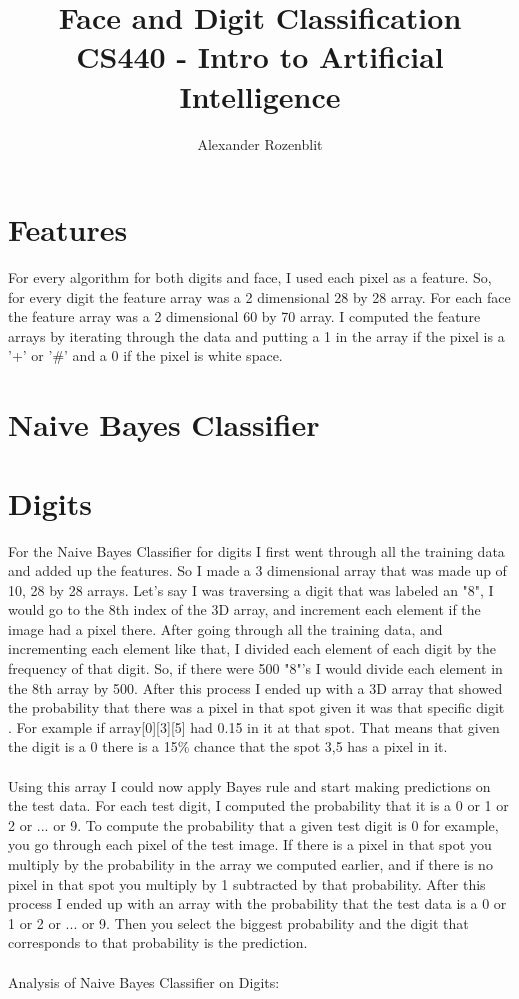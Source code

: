 \documentclass[12pt]{article}
\begin{document}
\title{%
 Face and Digit Classification \\
  \large CS440 - Intro to Artificial Intelligence}

\author{Alexander Rozenblit}


\maketitle

\section*{Features}
For every algorithm for both digits and face, I used each pixel as a feature. So, for every digit the feature array was a 2 dimensional 28 by 28 array. For each face the feature array was a 2 dimensional 60 by 70 array. I computed the feature arrays by iterating through the data and putting a 1 in the array if the pixel is a '+' or '\#' and a 0 if the pixel is white space.

\section*{Naive Bayes Classifier}
\section*{Digits}
For the Naive Bayes Classifier for digits I first went through all the training data and added up the features. So I made a 3 dimensional array that was made up of 10, 28 by 28 arrays. Let's say I was traversing a digit that was labeled an "8", I would go to the 8th index of the 3D array, and increment each element if the image had a pixel there. After going through all the training data, and incrementing each element like that, I divided each element of each digit by the frequency of that digit. So, if there were 500 "8"'s I would divide each element in the 8th array by 500. After this process I ended up with a 3D array that showed the probability that there was a pixel in that spot given it was that specific digit . For example if array[0][3][5] had 0.15 in it at that spot. That means that given the digit is a 0 there is a 15\% chance that the spot 3,5 has a pixel in it.\\\\
Using this array I could now apply Bayes rule and start making predictions on the test data. For each test digit, I computed the probability that it is a 0 or 1 or 2 or ... or 9. To compute the probability that a given test digit is 0 for example, you go through each pixel of the test image. If there is a pixel in that spot you multiply by the probability in the array we computed earlier, and if there is no pixel in that spot you multiply by 1 subtracted by that probability. After this process I ended up with an array with the probability that the test data is a 0 or 1 or 2 or ... or 9. Then you select the biggest probability and the digit that corresponds to that probability is the prediction.\\\\
Analysis of Naive Bayes Classifier on Digits:\\\\
\end{document}
